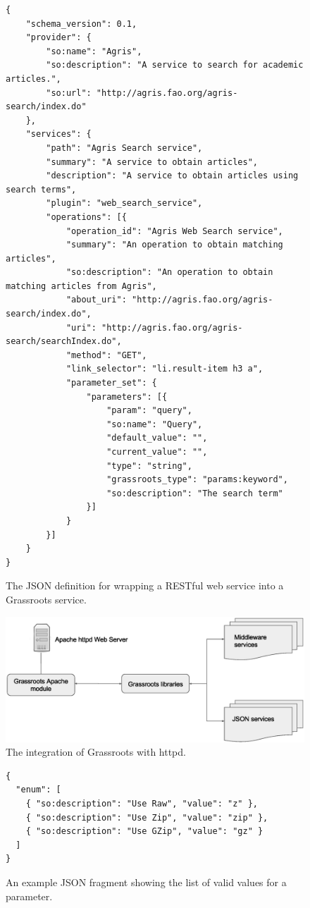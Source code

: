 \documentclass[12pt,a4paper]{extarticle}
\begin{document}
\begin{figure}[ht]
\centering
\begin{lstlisting}[style=json]
{
	"schema_version": 0.1,
	"provider": {
		"so:name": "Agris",
		"so:description": "A service to search for academic articles.",
		"so:url": "http://agris.fao.org/agris-search/index.do"
	},
	"services": {
		"path": "Agris Search service",
		"summary": "A service to obtain articles",
		"description": "A service to obtain articles using search terms",    
		"plugin": "web_search_service",
		"operations": [{
			"operation_id": "Agris Web Search service",
			"summary": "An operation to obtain matching articles",
			"so:description": "An operation to obtain matching articles from Agris",
			"about_uri": "http://agris.fao.org/agris-search/index.do",
			"uri": "http://agris.fao.org/agris-search/searchIndex.do",
			"method": "GET",
			"link_selector": "li.result-item h3 a",
			"parameter_set": {
				"parameters": [{
					"param": "query",
					"so:name": "Query",
					"default_value": "",
					"current_value": "",
					"type": "string",
					"grassroots_type": "params:keyword",
					"so:description": "The search term"
				}]
			}
		}]
	}
}
\end{lstlisting}
\caption{\label{fig:json_service}The JSON definition for wrapping a RESTful web service into a Grassroots service.}
\end{figure}

\begin{figure}[ht]
\centering
\includegraphics[width=\textwidth]{apache_grassroots}
\caption{\label{fig:httd_grassroots} The integration of Grassroots with httpd.}
\end{figure}


\begin{figure}[ht]
\centering
\begin{lstlisting}[style=json]
{
  "enum": [
    { "so:description": "Use Raw", "value": "z" },
    { "so:description": "Use Zip", "value": "zip" },
    { "so:description": "Use GZip", "value": "gz" }
  ]
}
\end{lstlisting}
\caption{\label{fig:parameter_enum}An example JSON fragment showing the list of valid values for a parameter.}
\end{figure}
\end{document}
